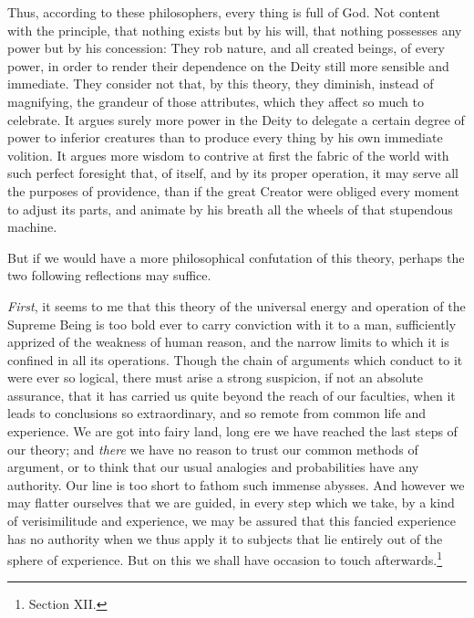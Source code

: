 \documentclass[]{article}
\newcounter{authornote}[page]
\newcommand*{\authornote}[1]{\renewcommand{\thefootnote}{\fnsymbol{footnote}}\stepcounter{authornote}\footnote[\value{authornote}]{#1}\renewcommand{\thefootnote}{\arabic{footnote}}}
\begin{document}
\begin{sectionbody}
\humeparagraph  Thus, according to these philosophers, every thing is full of God. Not content with the principle, that nothing exists but by his will, that nothing possesses any power but by his concession: They rob nature, and all created beings, of every power, in order to render their dependence on the Deity still more sensible and immediate. They consider not that, by this theory, they diminish, instead of magnifying, the grandeur of those attributes, which they affect so much to celebrate. It argues surely more power in the Deity to delegate a certain degree of power to inferior creatures than to produce every thing by his own immediate volition. It argues more wisdom to contrive at first the fabric of the world with such perfect foresight that, of itself, and by its proper operation, it may serve all the purposes of providence, than if the great Creator were obliged every moment to adjust its parts, and animate by his breath all the wheels of that stupendous machine.

\humeparagraph  But if we would have a more philosophical confutation of this theory, perhaps the two following reflections may suffice.

\humeparagraph  \emph{First}, it seems to me that this theory of the universal energy and operation of the Supreme Being is too bold ever to carry conviction with it to a man, sufficiently apprized of the weakness of human reason, and the narrow limits to which it is confined in all its operations. Though the chain of arguments which conduct to it were ever so logical, there must arise a strong suspicion, if not an absolute assurance, that it has carried us quite beyond the reach of our faculties, when it leads to conclusions so extraordinary, and so remote from common life and experience. We are got into fairy land, long ere we have reached the last steps of our theory; and \emph{there} we have no reason to trust our common methods of argument, or to think that our usual analogies and probabilities have any authority. Our line is too short to fathom such immense abysses. And however we may flatter ourselves that we are guided, in every step which we take, by a kind of verisimilitude and experience, we may be assured that this fancied experience has no authority when we thus apply it to subjects that lie entirely out of the sphere of experience. But on this we shall have occasion to touch afterwards.\authornote{Section XII.}


\end{sectionbody}
\end{document}
